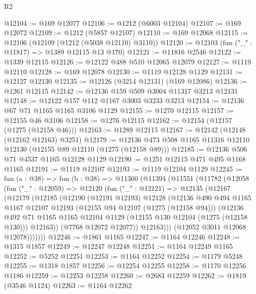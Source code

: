 \begin{lexlean}{R2}
\begin{coremodule}
@12104 := @169 @12077
@12106 := @1212 (@6003 @12104)
@12107 := @169 @12072
@12109 := @1212 (@5857 @12107)
@12110 := @169 @12068
@12115 := @12106 (@12109 (@1212 (@5038 @12110) @3110))
@12120 := @12103 (fun ("_" : @11817) => @1389 @12115 @13 @170)
@12121 := @11816 @2546
@12122 := @1339 @12115
@12126 := @12122 @488 @510 @12065 @12079
@12127 := @1119 @12110
@12128 := @169 @12078
@12130 := @1119 @12128 @1129
@12131 := @12127 @12130
@12135 := @12126 (@3214 @12131) (@169 @12086)
@12136 := @1261 @12115
@12142 := @12136 @159 @509 @3004 @11317 @3213 @12131
@12148 := @12122 @157 @112 @1167 @3003 @3233 @3213
@12154 := @12136 @67 @71 @1165 @1165 @3106 @1129
@12155 := @1270 @12115
@12157 := @12155 @46 @3106
@12158 := @1276 @12115
@12162 := @12154 (@12157 (@1275 (@12158 @46)))
@12163 := @1289 @12115
@12167 := @12142 (@12148 (@12162 @12163) @3251)
@12179 := @12136 @473 @508 @1165 @11316 @12110 @12130 (@12155 @89 @12110 (@1275 (@12158 @89)))
@12185 := @12136 @506 @71 @4537 @1165 @12128 @1129
@12190 := @1251 @12115 @471 @495 @1168 @1165
@12191 := @1119 @12107
@12193 := @1119 @12104 @1129
@12245 := fun (a : @38) =>
  fun (b : @38) =>
  @11360
    (@11394
      (@11551
        (@11782
          (@12058
            (fun ("_" : @12059) =>
            @12120
              (fun ("_" : @12121) =>
              @12135
                (@12167
                  (@12179
                    (@12185
                      (@12190
                        (@12191 @12193)
                        @12128
                        (@12136
                          @490
                          @494
                          @1165
                          @1167
                          @12107
                          @12193
                          (@12155 @94 @12107 (@1275 (@12158 @94)))
                          (@12136
                            @492
                            @71
                            @1165
                            @1165
                            @12104
                            @1129
                            (@12155 @130 @12104 (@1275 (@12158 @130)))
                            @12163))
                        (@7768 @12072 @12077))
                      @12163)))
                (@12052 @3011 @12068 @12078)))))))
@12246 := @1861 @1165
@12247 := @1164 @12246
@12248 := @1315 @1857
@12249 := @12247 @12248
@12251 := @1164 @12249 @1165
@12252 := @5252 @12251
@12253 := @1164 @12252
@12254 := @1179 @5248
@12255 := @1318 @1857
@12256 := @12254 @12255
@12258 := @1170 @12256 @1186
@12259 := @12253 @12258
@12260 := @2683 @12259
@12262 := @1819 (@3546 @1124)
@12263 := @1164 @12262

\end{coremodule}
\end{lexlean}
